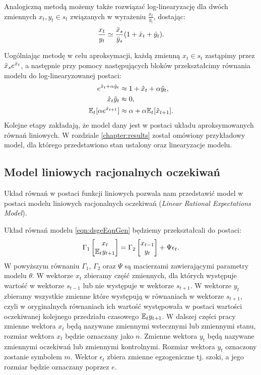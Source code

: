 Analogiczną metodą możemy także rozwiązać log-linearyzację dla dwóch zmiennych $x_t,y_t \in s_t$ związanych w wyrażeniu $\frac{x_t}{y_t}$, dostając:
\begin{equation}
    \frac{x_t}{y_t} \simeq \frac{\bar{x}_s}{\bar{y}_s}(1 + \hat{x}_t + \hat{y}_t).
\end{equation}

Uogólniając metodę w celu aproksymacji, każdą zmienną $x_t \in s_t$ zastąpimy przez $\bar{x}_se^{\hat{x}_t}$, a następnie przy pomocy następujących bloków przekształcimy równania modelu do log-linearyzowanej postaci:
\begin{align}
    e^{\hat{x}_t + \alpha \hat{y}_t} &\approx 1 + \hat{x}_t + \alpha \hat{y}_t, \\
    \hat{x}_t \hat{y}_t &\approx 0, \\
    \mathbb{E}_t[\alpha e^{\hat{x}_{t+1}}] &\approx \alpha +  \alpha \mathbb{E}_t[ \hat{x}_{t+1}].
\end{align}
Kolejne etapy zakładają, że model dany jest w postaci układu aproksymowanych równań liniowych. W rozdziale \ref{chapter:results} został omówiony przykładowy model, dla którego przedstawiono stan ustalony oraz linearyzacje modelu.

\subsection{Model liniowych racjonalnych oczekiwań}

Układ równań w postaci funkcji liniowych pozwala nam przedstawić model w postaci modelu liniowych racjonalnych oczekiwań (\emph{Linear Rational Expectations Model}). 

Układ równań modelu \eqref{eqn:dsgeEqnGen} będziemy przekształcali do postaci:
\begin{equation}
    \label{eq:lre-model}
    \Gamma_1 
    \begin{bmatrix}
    x_{t} \\
    \mathbb{E}_t y_{t+1}
\end{bmatrix} = \Gamma_2 \begin{bmatrix}
    x_{t-1} \\
    y_{t}
\end{bmatrix} + \Psi \epsilon_t.
\end{equation}
W powyższym równaniu $\Gamma_1$, $\Gamma_2$ oraz $\Psi$ są macierzami zawierającymi parametry modelu $\theta$. W wektorze $x_{t}$ zbieramy część zmiennych, dla których występuje wartość w wektorze $s_{t-1}$ lub nie występuje w wektorze $s_{t+1}$. W wektorze $y_t$ zbieramy wszystkie zmienne które występują w równaniach w wektorze $s_{t+1}$, czyli w oryginalnych równaniach ich wartość występowała w postaci wartości oczekiwanej kolejnego przedziału czasowego $\mathbb{E}_t y_{t+1}$. W dalszej części pracy zmienne wektora $x_t$ będą nazywane zmiennymi wstecznymi lub zmiennymi stanu, rozmiar wektora $x_t$ będzie oznaczany jako $n$. Zmienne wektora $y_t$ będą nazywane zmiennymi oczekiwań lub zmiennymi kontrolnymi. Rozmiar wektora $y_t$ oznaczony zostanie symbolem  $m$. Wektor $\epsilon_t$ zbiera zmienne egzogeniczne tj. szoki, a jego rozmiar będzie oznaczany poprzez $e$.


